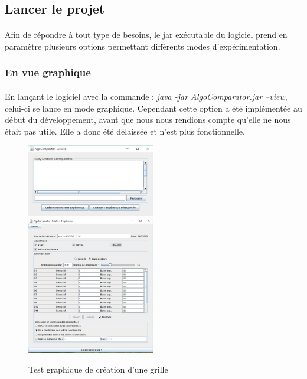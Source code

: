 \documentclass[pidr]{tnreport}
\begin{document}
							
		\subsection{Lancer le projet}

\paragraph{}
Afin de répondre à tout type de besoins, le jar exécutable du logiciel prend en paramètre plusieurs options permettant différents modes d'expérimentation.

			\subsubsection{En vue graphique}

\paragraph{}
En lançant le logiciel avec la commande : \emph{java -jar AlgoComparator.jar --view}, celui-ci se lance en mode graphique. Cependant cette option a été implémentée au début du développement, avant que nous nous rendions compte qu'elle ne nous était pas utile. Elle a donc été délaissée et n'est plus fonctionnelle.

\begin{figure}[!ht]
    \includegraphics[width=0.5\textwidth]{./figures/ac_accueil.jpg}
    \includegraphics[width=0.5\textwidth]{./figures/ac_exp.jpg}
    \caption{Test graphique de création d'une grille}
\end{figure}
\end{document}
